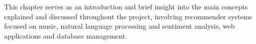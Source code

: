 This chapter serves as an introduction and brief insight into the main concepts explained and discussed throughout the project, involving recommender systems focused on music, natural language processing and sentiment analysis, web applications and database management.